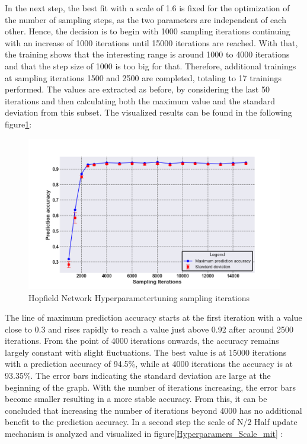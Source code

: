 In the next step, the best fit with a scale of 1.6 is fixed for the optimization of the number of sampling steps, as the two parameters are independent of each other. 
Hence, the decision is to begin with 1000 sampling iterations continuing with an increase of 1000 iterations until 15000 iterations are reached. 
With that, the training shows that the interesting range is around 1000 to 4000 iterations and that the step size of 1000 is too big for that. 
Therefore, additional trainings at sampling iterations 1500 and 2500 are completed, totaling to 17 trainings performed.
The values are extracted as before, by considering the last 50 iterations and then calculating both the maximum value and the standard deviation from this subset.
The visualized results can be found in the following figure\ref{Hyperparamers_Iteraions_ohne}:
\begin{figure}[H]
    \centering
    \includegraphics[width=0.8\linewidth]{graphics/Iterations_Ohne_N2_Half_Pred_Acc.png}
    \caption{Hopfield Network Hyperparametertuning sampling iterations}
    \label{Hyperparamers_Iteraions_ohne}
\end{figure}
The line of maximum prediction accuracy starts at the first iteration with a value close to 0.3 and rises rapidly to reach a value just above 0.92 after around 2500 iterations.
From the point of 4000 iterations onwards, the accuracy remains largely constant with slight fluctuations.
The best value is at 15000 iterations with a prediction accuracy of 94.5\%, while at 4000 iterations the accuracy is at 93.35\%.
The error bars indicating the standard deviation are large at the beginning of the graph.
With the number of iterations increasing, the error bars become smaller resulting in a more stable accuracy.
From this, it can be concluded that increasing the number of iterations beyond 4000 has no additional benefit to the prediction accuracy. 
In a second step the scale of N/2 Half update mechanism is analyzed and visualized in figure\ref{Hyperparamers_Scale_mit} :
